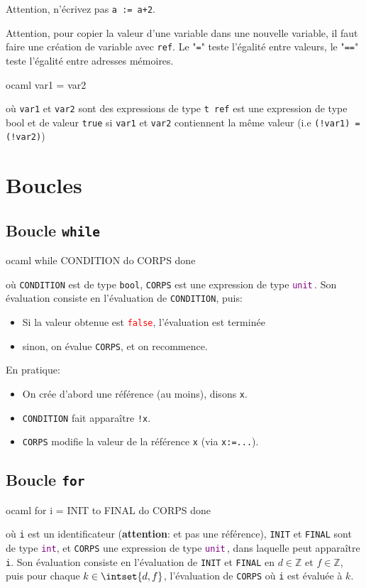 \documentclass{scrartcl}
\newcommand{\unit}{\textcolor{purple}{\texttt{unit}}\,}
\newcommand{\codefalse}{\textcolor{red}{\texttt{false}}}
\begin{document}
		\rem Attention, n'écrivez pas \verb|a := a+2|.

		\rem Attention, pour copier la valeur d'une variable dans une nouvelle variable, il faut faire une création de variable avec \verb|ref|.
		Le "\verb|=|" teste l'égalité entre valeurs, le "\verb|==|" teste l'égalité entre adresses mémoires. 

		\begin{code}{ocaml}
			var1 = var2
		\end{code}
		où \verb|var1| et \verb|var2| sont des expressions de type \verb|t ref| est une expression de type bool 
		et de valeur \verb|true| si \verb|var1| et \verb|var2| contiennent la même valeur (i.e \verb|(!var1) = (!var2)|)

	\section{Boucles}
		\subsection{Boucle \texttt{while}}
			\begin{code}{ocaml}
				while CONDITION do
					CORPS
				done
			\end{code}
			où \verb|CONDITION| est de type \verb|bool|, \verb|CORPS| est une expression de type \unit.
			Son évaluation consiste en l'évaluation de \verb|CONDITION|, puis:
			\begin{itemize}
				\item Si la valeur obtenue est \codefalse, l'évaluation est terminée
				\item sinon, on évalue \verb|CORPS|, et on recommence.
			\end{itemize}

			En pratique:
			\begin{itemize}
				\item On crée d'abord une référence (au moins), disons \verb|x|.
				\item \verb|CONDITION| fait apparaître \verb|!x|.
				\item \verb|CORPS| modifie la valeur de la référence \verb|x| (via \texttt{x:=...}).
			\end{itemize}
		\subsection{Boucle \texttt{for}}
			\begin{code}{ocaml}
				for i = INIT to FINAL do
					CORPS
				done
			\end{code}
			où \verb|i| est un identificateur (\textbf{attention}: et pas une référence),
			\verb|INIT| et \verb|FINAL| sont de type \textcolor{purple}{\texttt{int}}, et \verb|CORPS| une expression de type \unit, dans laquelle peut apparaître \verb|i|.
			Son évaluation consiste en l'évaluation de \verb|INIT| et \verb|FINAL| en $d \in \mathbb{Z}$ et $f \in \mathbb{Z}$,
			puis pour chaque $k \in \intset{d,f}$, l'évaluation de \verb|CORPS| où \verb|i| est évaluée à $k$.
\end{document}
